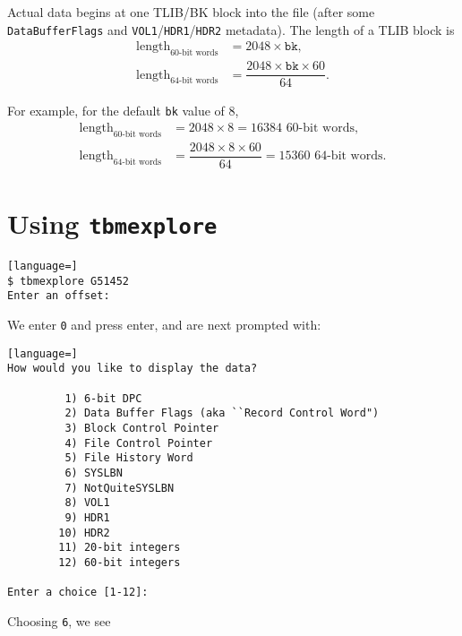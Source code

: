 \documentclass{report}
\begin{document}
Actual data begins at one TLIB/BK block into the file (after some \texttt{DataBufferFlags} and \texttt{VOL1}/\texttt{HDR1}/\texttt{HDR2} metadata). The length of a TLIB block is
\begin{align*}
	\text{length}_\text{60-bit words} &= 2048 \times \texttt{bk} \mathrm{,} \\
	\text{length}_\text{64-bit words} &= \dfrac{2048 \times \texttt{bk} \times 60}{64} \mathrm{.}
\end{align*}

For example, for the default \texttt{bk} value of \(8\),
\begin{align*}
	\text{length}_\text{60-bit words} &= 2048 \times 8 = 16384 \text{ 60-bit words} \mathrm{,} \\
	\text{length}_\text{64-bit words} &= \dfrac{2048 \times 8 \times 60}{64} = 15360 \text{ 64-bit words} \mathrm{.}
\end{align*}

\chapter{Using \texttt{tbmexplore}}

\begin{lstlisting}[language=]
$ tbmexplore G51452
Enter an offset: 
\end{lstlisting}

\noindent We enter \texttt{0} and press enter, and are next prompted with:

\begin{lstlisting}[language=]
How would you like to display the data?

         1) 6-bit DPC
         2) Data Buffer Flags (aka ``Record Control Word")
         3) Block Control Pointer
         4) File Control Pointer
         5) File History Word
         6) SYSLBN
         7) NotQuiteSYSLBN
         8) VOL1
         9) HDR1
        10) HDR2
        11) 20-bit integers
        12) 60-bit integers

Enter a choice [1-12]: 
\end{lstlisting}

\noindent Choosing \texttt{6}, we see
\end{document}
